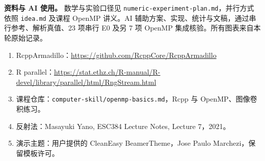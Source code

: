 \documentclass[UTF8,10.5pt,a4paper]{ctexart}
\begin{document}
{\footnotesize
\textbf{资料与 AI 使用。} 数学与实验口径见 \texttt{numeric-experiment-plan.md}，并行方式依照 \texttt{idea.md} 及课程 OpenMP 讲义。AI 辅助方案、实现、统计与文稿，通过串行参考、解析真值、23 项串行 E0 及另 7 项 OpenMP 集成核验。所有图表来自本轮原始记录。
\begin{enumerate}[leftmargin=1.5em]
\item RcppArmadillo：\url{https://github.com/RcppCore/RcppArmadillo}
\item R parallel：\url{https://stat.ethz.ch/R-manual/R-devel/library/parallel/html/RngStream.html}
\item 课程仓库：\texttt{computer-skill/openmp-basics.md}，Rcpp 与 OpenMP、图像卷积练习。
\item 反射法：Masayuki Yano, ESC384 Lecture Notes, Lecture 7，2021。
\item 演示主题：用户提供的 CleanEasy BeamerTheme，Jose Paulo Marchezi，保留模板许可。
\end{enumerate}}
\end{document}
